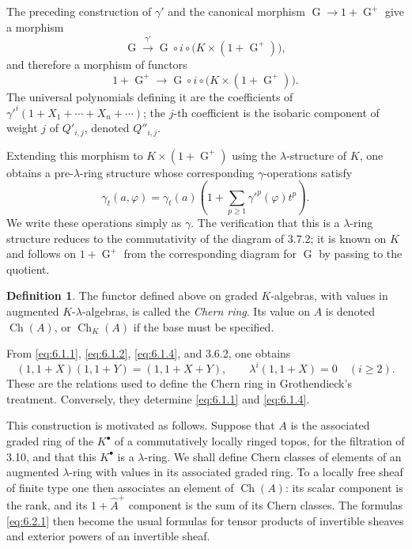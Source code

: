 \documentclass[11pt]{article}
\theoremstyle{plain}
\theoremstyle{definition}
\newtheorem{definition}[theorem]{Definition}
\theoremstyle{remark}
\providecommand{\Go}{\operatorname{G}}
\providecommand{\Got}{\operatorname{G}}
\providecommand{\Gou}{\operatorname{G}}
\providecommand{\Ch}{\operatorname{Ch}}
\begin{document}
The preceding construction of $\gamma'$ and the canonical morphism $\Go\to 1+\Go^+$ give a morphism
\[
\Got\xrightarrow{\gamma'}\Gou\circ i\circ\bigl(K\times(1+\Go^+)\bigr),
\]
and therefore a morphism of functors
\[
1+\Go^+\longrightarrow\Gou\circ i\circ\bigl(K\times(1+\Go^+)\bigr).
\]
The universal polynomials defining it are the coefficients of $\gamma'^i(1+X_1+\cdots+X_n+\cdots)$; the $j$-th coefficient is the isobaric component of weight $j$ of $Q'_{i,j}$, denoted $Q''_{i,j}$.

Extending this morphism to $K\times(1+\Go^+)$ using the $\lambda$-structure of $K$, one obtains a pre-$\lambda$-ring structure whose corresponding $\gamma$-operations satisfy
\begin{equation}\label{eq:6.1.4}
\gamma_t(a,\varphi)=\gamma_t(a)\left(1+\sum_{p\geq 1}\gamma'^p(\varphi)t^p\right).
\end{equation}
We write these operations simply as $\gamma$. The verification that this is a $\lambda$-ring structure reduces to the commutativity of the diagram of 3.7.2; it is known on $K$ and follows on $1+\Go^+$ from the corresponding diagram for $\Go$ by passing to the quotient.

\begin{definition}
The functor defined above on graded $K$-algebras, with values in augmented $K$-$\lambda$-algebras, is called the \emph{Chern ring}. Its value on $A$ is denoted $\Ch(A)$, or $\Ch_K(A)$ if the base must be specified.
\end{definition}

From \eqref{eq:6.1.1}, \eqref{eq:6.1.2}, \eqref{eq:6.1.4}, and 3.6.2, one obtains
\begin{equation}\label{eq:6.2.1}
(1,1+X)(1,1+Y)=(1,1+X+Y),
\qquad
\lambda^i(1,1+X)=0\quad(i\geq 2).
\end{equation}
These are the relations used to define the Chern ring in Grothendieck's treatment. Conversely, they determine \eqref{eq:6.1.1} and \eqref{eq:6.1.4}.

This construction is motivated as follows. Suppose that $A$ is the associated graded ring of the $K^{\bullet}$ of a commutatively locally ringed topos, for the filtration of 3.10, and that this $K^{\bullet}$ is a $\lambda$-ring. We shall define Chern classes of elements of an augmented $\lambda$-ring with values in its associated graded ring. To a locally free sheaf of finite type one then associates an element of $\Ch(A)$: its scalar component is the rank, and its $1+\widehat A^+$ component is the sum of its Chern classes. The formulas \eqref{eq:6.2.1} then become the usual formulas for tensor products of invertible sheaves and exterior powers of an invertible sheaf.
\end{document}
